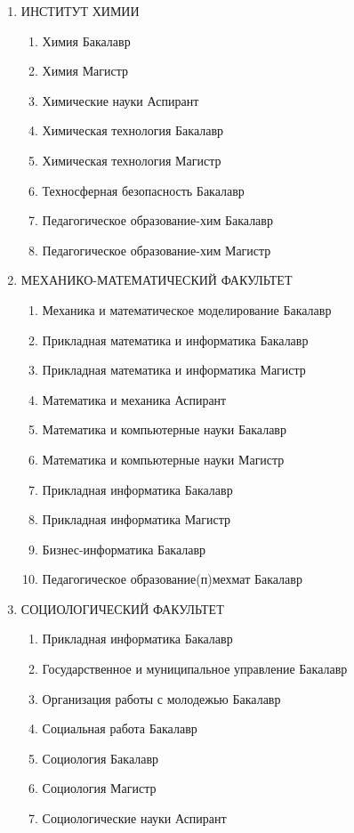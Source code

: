\begin{enumerate}
\item ИНСТИТУТ ХИМИИ
\begin{enumerate}
\item Химия	Бакалавр
\item Химия	Магистр
\item Химические науки	Аспирант
\item Химическая технология	Бакалавр
\item Химическая технология	Магистр
\item Техносферная безопасность	Бакалавр
\item Педагогическое образование-хим	Бакалавр
\item Педагогическое образование-хим	Магистр
\end{enumerate}

\item МЕХАНИКО-МАТЕМАТИЧЕСКИЙ ФАКУЛЬТЕТ
\begin{enumerate}
\item Механика и математическое моделирование	Бакалавр
\item Прикладная математика и информатика	Бакалавр
\item Прикладная математика и информатика	Магистр
\item Математика и механика	Аспирант
\item Математика и компьютерные науки	Бакалавр
\item Математика и компьютерные науки	Магистр
\item Прикладная информатика	Бакалавр
\item Прикладная информатика	Магистр
\item Бизнес-информатика	Бакалавр
\item Педагогическое образование(п)мехмат	Бакалавр
\end{enumerate}

\item СОЦИОЛОГИЧЕСКИЙ ФАКУЛЬТЕТ
\begin{enumerate}
\item Прикладная информатика	Бакалавр
\item Государственное и муниципальное управление	Бакалавр
\item Организация работы с молодежью	Бакалавр
\item Социальная работа	Бакалавр
\item Социология	Бакалавр
\item Социология	Магистр
\item Социологические науки	Аспирант
\end{enumerate}


\end{enumerate}
